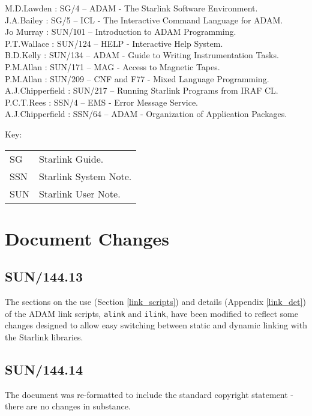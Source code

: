 \documentclass[twoside,11pt]{article}
\newcommand{\htmlref}[2]{#1}
\newcommand{\latex}[1]{#1}
\newcommand{\xref}[3]{#1}
\newcommand{\xlabel}[1]{}
\renewcommand{\_}{\texttt{\symbol{95}}}
\begin{document}
\begin{htmlonly}
M.D.Lawden : \xref{SG/4}{sg4}{}
-- ADAM - The Starlink Software Environment.\\
J.A.Bailey : \xref{SG/5}{sg4}{}
-- ICL - The Interactive Command Language for ADAM.\\
Jo Murray : \xref{SUN/101}{sun101}{}
-- Introduction to ADAM Programming.\\
P.T.Wallace : \xref{SUN/124}{sun124}{} 
-- HELP - Interactive Help System.\\
B.D.Kelly : \xref{SUN/134}{sun134}{} 
-- ADAM - Guide to Writing Instrumentation Tasks.\\
P.M.Allan : \xref{SUN/171}{sun171}{}
-- MAG - Access to Magnetic Tapes.\\
P.M.Allan : \xref{SUN/209}{sun209}{}
-- CNF and F77 - Mixed Language Programming.\\
A.J.Chipperfield : \xref{SUN/217}{sun217}{}
-- Running Starlink Programs from IRAF CL.\\
P.C.T.Rees : \xref{SSN/4}{ssn4}{}
-- EMS - Error Message Service.\\
A.J.Chipperfield : \xref{SSN/64}{ssn64}{}
-- ADAM - Organization of Application Packages.
\end{htmlonly}

Key:
\begin{tabular}{ll}
SG & Starlink Guide.\\
SSN & Starlink System Note.\\
SUN & Starlink User Note.
\end{tabular}

\section{\xlabel{document_changes}Document Changes}
\subsection{SUN/144.13}
The sections on the 
\htmlref{use}{link_scripts}\latex{ (Section \ref{link_scripts})} 
and
\htmlref{details}{link_det}\latex{ (Appendix \ref{link_det})} 
of the ADAM link scripts, \texttt{alink} and \texttt{ilink}, have been modified
to reflect some changes designed to allow easy switching between static and 
dynamic linking with the Starlink libraries.

\subsection{SUN/144.14}
The document was re-formatted to include the standard copyright statement -
there are no changes in substance.
\end{document}
